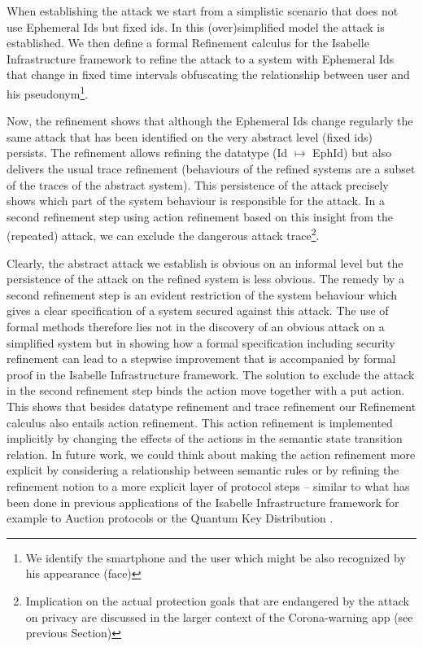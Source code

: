 \documentclass{llncs}
\begin{document}
When establishing the attack we start from a simplistic scenario that does not use Ephemeral Ids but fixed ids.
In this (over)simplified model the attack is established. We then define a formal Refinement calculus for
the Isabelle Infrastructure framework to refine the attack to a system with Ephemeral Ids that change in fixed
time intervals obfuscating the relationship between user and his pseudonym\footnote{We identify the smartphone
  and the user which might be also recognized by his appearance (face)}.

Now, the refinement shows that although the Ephemeral Ids change regularly the same attack that has been
identified on the very abstract level (fixed ids) persists.
The refinement allows refining the datatype (Id $\mapsto$ EphId) but also delivers the usual trace
refinement (behaviours of the refined systems are a subset of the traces of the abstract system).
This persistence of the attack precisely shows which part of the system behaviour is responsible for the
attack. In a second refinement step using action refinement based on this insight from the (repeated)
attack, we can exclude the dangerous attack trace\footnote{Implication on the actual protection goals
  that are endangered by the attack on privacy are discussed in the larger context of the Corona-warning
  app (see previous Section)}.

Clearly, the abstract attack we establish is obvious on an informal level but the persistence of the attack
on the refined system is less obvious. The remedy by a second refinement step is an evident restriction of
the system behaviour which gives a clear specification of a system secured against this attack. The use of
formal methods therefore lies not in the discovery of an obvious attack on a simplified system but in showing
how a formal specification including security refinement can lead to a stepwise improvement that is accompanied
by formal proof in the Isabelle Infrastructure framework. The solution to exclude the attack in the second refinement
step binds the action move together with a put action. %
This shows that besides datatype refinement and trace refinement our Refinement calculus also entails action
refinement. This action refinement is implemented implicitly by changing the effects of the actions
in the semantic state transition relation. In future work, we could think about making the action refinement
more explicit by considering a relationship between semantic rules or by refining the refinement notion to
a more explicit layer of protocol steps -- similar to what has been done in previous applications of the
Isabelle Infrastructure framework for example to Auction protocols \cite{kkp:17} or the Quantum Key Distribution \cite{kam:19c}.
\end{document}
